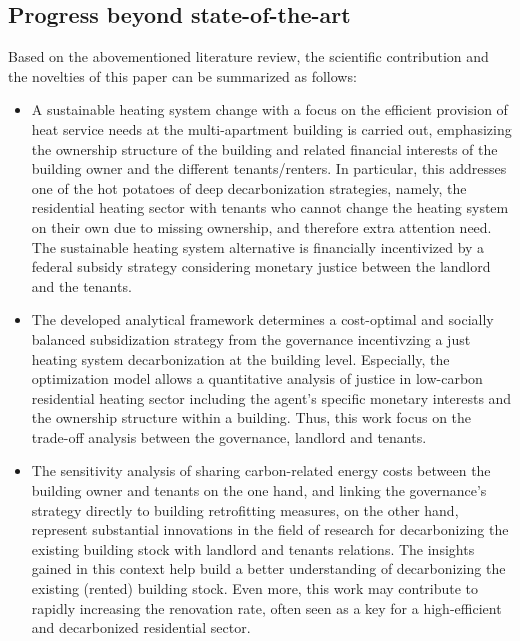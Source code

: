 \subsection{Progress beyond state-of-the-art}\label{novelties}
Based on the abovementioned literature review, the scientific contribution and the novelties of this paper can be summarized as follows:
\begin{itemize}
	\item A sustainable heating system change with a focus on the efficient provision of heat service needs at the multi-apartment building is carried out, emphasizing the ownership structure of the building and related financial interests of the building owner and the different tenants/renters. In particular, this addresses one of the hot potatoes of deep decarbonization strategies, namely, the residential heating sector with tenants who cannot change the heating system on their own due to missing ownership, and therefore extra attention need. The sustainable heating system alternative is financially incentivized by a federal subsidy strategy considering monetary justice between the landlord and the tenants. 
	\item The developed analytical framework determines a cost-optimal and socially balanced subsidization strategy from the governance incentivzing a just heating system decarbonization at the building level. Especially, the optimization model allows a quantitative analysis of justice in low-carbon residential heating sector including the agent's specific monetary interests and the ownership structure within a building. Thus, this work focus on the trade-off analysis between the governance, landlord and tenants.
	\item The sensitivity analysis of sharing carbon-related energy costs between the building owner and tenants on the one hand, and linking the governance's strategy directly to building retrofitting measures, on the other hand, represent substantial innovations in the field of research for decarbonizing the existing building stock with landlord and tenants relations. The insights gained in this context help build a better understanding of decarbonizing the existing (rented) building stock. Even more, this work may contribute to rapidly increasing the renovation rate, often seen as a key for a high-efficient and decarbonized residential sector. 
\end{itemize}